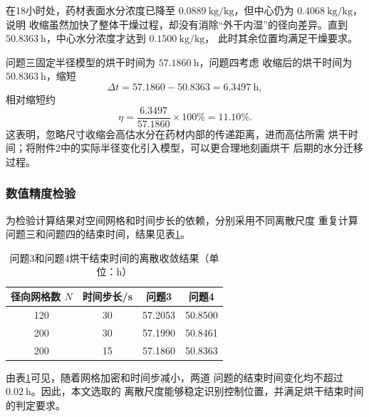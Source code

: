 \documentclass[12pt,a4paper]{article}
\newcommand{\prompt}[1]{\par\noindent\textbf{【写作提示】}#1\par}      %
\begin{document}
在18小时处，药材表面水分浓度已降至
$0.0889\ \mathrm{kg/kg}$，但中心仍为 $0.4068\ \mathrm{kg/kg}$，说明
收缩虽然加快了整体干燥过程，却没有消除“外干内湿”的径向差异。直到
$50.8363\ \mathrm{h}$，中心水分浓度才达到 $0.1500\ \mathrm{kg/kg}$，
此时其余位置均满足干燥要求。

问题三固定半径模型的烘干时间为 $57.1860\ \mathrm{h}$，问题四考虑
收缩后的烘干时间为 $50.8363\ \mathrm{h}$，缩短
\begin{equation}
\Delta t=57.1860-50.8363=6.3497\ \mathrm{h},
\end{equation}
相对缩短约
\begin{equation}
\eta=\frac{6.3497}{57.1860}\times100\%=11.10\%.
\label{eq:q4-reduction}
\end{equation}
这表明，忽略尺寸收缩会高估水分在药材内部的传递距离，进而高估所需
烘干时间；将附件2中的实际半径变化引入模型，可以更合理地刻画烘干
后期的水分迁移过程。

\subsubsection{数值精度检验}

为检验计算结果对空间网格和时间步长的依赖，分别采用不同离散尺度
重复计算问题三和问题四的结束时间，结果见表\ref{tab:q34-convergence}。

\begin{table}[H]
\centering
\caption{问题3和问题4烘干结束时间的离散收敛结果（单位：h）}
\label{tab:q34-convergence}
\begin{tabular}{cccc}
\toprule
径向网格数 $N$ & 时间步长/s & 问题3 & 问题4\\
\midrule
120 & 30 & 57.2053 & 50.8500\\
200 & 30 & 57.1990 & 50.8461\\
200 & 15 & 57.1860 & 50.8363\\
\bottomrule
\end{tabular}
\end{table}

由表\ref{tab:q34-convergence}可见，随着网格加密和时间步减小，两道
问题的结束时间变化均不超过 $0.02\ \mathrm{h}$。因此，本文选取的
离散尺度能够稳定识别控制位置，并满足烘干结束时间的判定要求。


\end{document}

